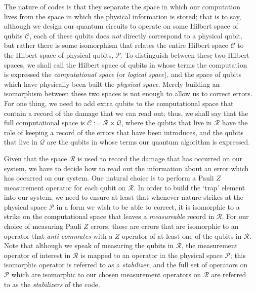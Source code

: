 \documentclass[twocolumn,showpacs,preprintnumbers,amsmath,amssymb,nofootinbib,pra,floatfix]{revtex4-1}
\begin{document}
The nature of codes is that they separate the space in which our computation lives from the space in which the physical information is
stored; that is to say, although we design our quantum circuits to operate on some Hilbert space of qubits $\mathscr{C}$, each of these qubits
does \emph{not} directly correspond to a physical qubit, but rather there is some isomorphism that relates the entire Hilbert space $\mathscr{C}$
to the Hilbert space of physical qubits, $\mathscr{P}$.  To distinguish between these two Hilbert spaces, we shall call the Hilbert space of qubits in whose terms the computation is expressed the \emph{computational space} (or \emph{logical space}), and the space of qubits which have physically been built the
\emph{physical space}.  Merely building an isomorphism between these two spaces is not enough to allow us to correct errors.  For one thing, we need to add extra qubits to the computational space that contain a record of the damage that we can read out; thus, we shall say that the full computational space is $\mathscr{C}:=\mathscr{R}\times\mathscr{Q}$, where the qubits that live in $\mathscr{R}$ have the role of keeping a
record of the errors that have been introduces, and the qubits that live in $\mathscr{Q}$ are the qubits in whose terms our quantum
algorithm is expressed.  

Given that the space $\mathscr{R}$ is used to record the damage that has occurred on our system, we have to decide how to read out the information about an error which has occurred on our system.  One natural choice is to perform a Pauli $Z$ measurement operator for each qubit on $\mathscr{R}$.  In order to build the `trap' element into our system, we need to ensure at least that whenever nature strikes at the physical space $\mathscr{P}$ in a form we wish to be able to correct, it is isomorphic to a strike on the computational space that leaves a \emph{measureable} record in $\mathscr{R}$.  For our choice of measuring Pauli $Z$ errors, these are errors that are isomorphic to an operator that \emph{anti-commutes} with a $Z$ operator of at least one of the qubits in $\mathscr{R}$.  Note that although we speak of measuring the qubits in $\mathscr{R}$, the measurement operator of interest in $\mathscr{R}$ is mapped to an operator in the physical space $\mathscr{P}$; this isomorphic operator is referred to as a \emph{stabilizer}, and the full set of operators on $\mathscr{P}$ which are isomorphic to our chosen measurement operators on $\mathscr{R}$ are referred to as the \emph{stabilizers} of the code.
\end{document}
